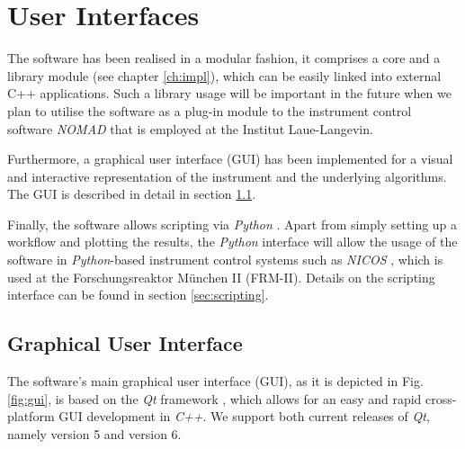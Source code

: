 %
%

\chapter{User Interfaces}
\label{ch:gui}

The software has been realised in a modular fashion, it comprises a core
and a library module (see chapter \ref{ch:impl}), which can be easily linked 
into external C++ applications. Such a library usage will be important in the
future when we plan to utilise the software as a plug-in module to the instrument
control software \textit{NOMAD} \cite{web_NOMAD} that is employed at the Institut 
Laue-Langevin.

Furthermore, a graphical user interface (GUI) has been implemented for a visual
and interactive representation of the instrument and the underlying algorithms.
The GUI is described in detail in section \ref{sec:gui}.

Finally, the software allows scripting via \textit{Python} \cite{Rossum2011, web_python}. 
Apart from simply setting up a workflow and plotting the results, the \textit{Python}
interface will allow the usage of the software in \textit{Python}-based instrument
control systems such as \textit{NICOS} \cite{web_NICOS}, which is used at the 
Forschungsreaktor M\"unchen II (FRM-II). 
Details on the scripting interface can be found in section \ref{sec:scripting}.





\section{Graphical User Interface}
\label{sec:gui}

The software's main graphical user interface (GUI), as it is depicted in Fig. \ref{fig:gui},
is based on the \textit{Qt} framework \cite{web_Qt}, which allows for an easy and rapid
cross-platform GUI development in \textit{C++}. We support both current releases of \textit{Qt},
namely version 5 and version 6.


